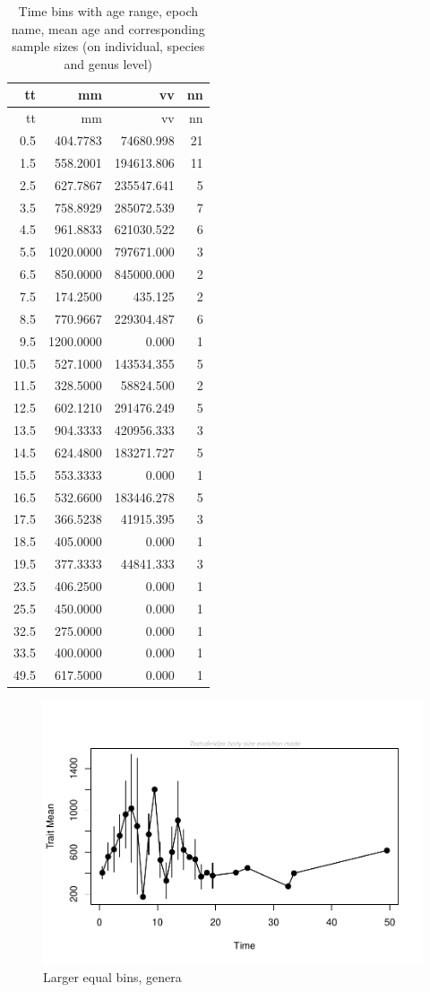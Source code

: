 \documentclass[]{article}
\begin{document}
\begin{longtable}[]{@{}rrrr@{}}
\caption{Time bins with age range, epoch name, mean age and
corresponding sample sizes (on individual, species and genus
level)}\tabularnewline
\toprule
tt & mm & vv & nn\tabularnewline
\midrule
\endfirsthead
\toprule
tt & mm & vv & nn\tabularnewline
\midrule
\endhead
0.5 & 404.7783 & 74680.998 & 21\tabularnewline
1.5 & 558.2001 & 194613.806 & 11\tabularnewline
2.5 & 627.7867 & 235547.641 & 5\tabularnewline
3.5 & 758.8929 & 285072.539 & 7\tabularnewline
4.5 & 961.8833 & 621030.522 & 6\tabularnewline
5.5 & 1020.0000 & 797671.000 & 3\tabularnewline
6.5 & 850.0000 & 845000.000 & 2\tabularnewline
7.5 & 174.2500 & 435.125 & 2\tabularnewline
8.5 & 770.9667 & 229304.487 & 6\tabularnewline
9.5 & 1200.0000 & 0.000 & 1\tabularnewline
10.5 & 527.1000 & 143534.355 & 5\tabularnewline
11.5 & 328.5000 & 58824.500 & 2\tabularnewline
12.5 & 602.1210 & 291476.249 & 5\tabularnewline
13.5 & 904.3333 & 420956.333 & 3\tabularnewline
14.5 & 624.4800 & 183271.727 & 5\tabularnewline
15.5 & 553.3333 & 0.000 & 1\tabularnewline
16.5 & 532.6600 & 183446.278 & 5\tabularnewline
17.5 & 366.5238 & 41915.395 & 3\tabularnewline
18.5 & 405.0000 & 0.000 & 1\tabularnewline
19.5 & 377.3333 & 44841.333 & 3\tabularnewline
23.5 & 406.2500 & 0.000 & 1\tabularnewline
25.5 & 450.0000 & 0.000 & 1\tabularnewline
32.5 & 275.0000 & 0.000 & 1\tabularnewline
33.5 & 400.0000 & 0.000 & 1\tabularnewline
49.5 & 617.5000 & 0.000 & 1\tabularnewline
\bottomrule
\end{longtable}

\begin{figure}[htbp]
\centering
\includegraphics{MA_JJ_files/figure-latex/Play around with larger time bins, generic level-1.pdf}
\caption{Larger equal bins, genera}
\end{figure}
\end{document}
